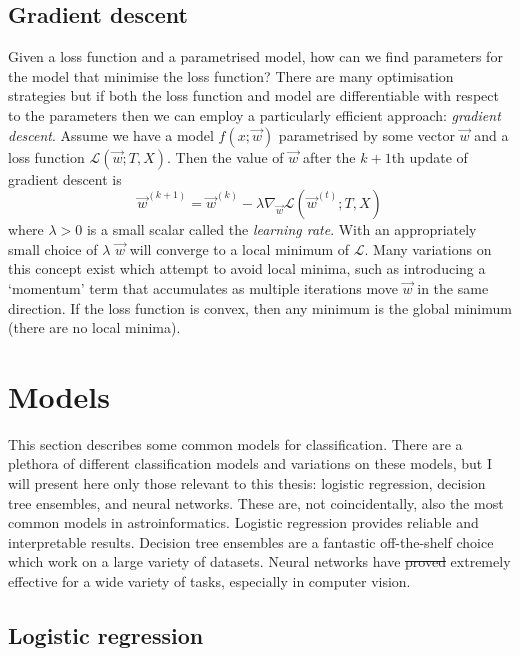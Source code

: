 \documentclass[11pt, a4paper]{book}
\newcommand{\defn}[1]{\emph{#1}}
\providecommand{\DIFaddtex}[1]{{\protect\color{blue}\uwave{#1}}} %
\providecommand{\DIFdeltex}[1]{{\protect\color{red}\sout{#1}}}                      %
\providecommand{\DIFaddbegin}{} %
\providecommand{\DIFaddend}{} %
\providecommand{\DIFdelbegin}{} %
\providecommand{\DIFdelend}{} %
\providecommand{\DIFadd}[1]{\texorpdfstring{\DIFaddtex{#1}}{#1}} %
\providecommand{\DIFdel}[1]{\texorpdfstring{\DIFdeltex{#1}}{}} %
\newcommand{\DIFscaledelfig}{0.5}
\newlength{\DIFdelgraphicswidth} %
\newlength{\DIFdelgraphicsheight} %
\newcommand{\DIFaddincludegraphics}[2][]{{\color{blue}\fbox{\DIFOincludegraphics[#1]{#2}}}} %
\newcommand{\DIFdelincludegraphics}[2][]{%
\sbox{\DIFdelgraphicsbox}{\DIFOincludegraphics[#1]{#2}}%
\settoboxwidth{\DIFdelgraphicswidth}{\DIFdelgraphicsbox} %
\settoboxtotalheight{\DIFdelgraphicsheight}{\DIFdelgraphicsbox} %
\scalebox{\DIFscaledelfig}{%
\parbox[b]{\DIFdelgraphicswidth}{\usebox{\DIFdelgraphicsbox}\\[-\baselineskip] \rule{\DIFdelgraphicswidth}{0em}}\llap{\resizebox{\DIFdelgraphicswidth}{\DIFdelgraphicsheight}{%
\setlength{\unitlength}{\DIFdelgraphicswidth}%
\begin{picture}(1,1)%
\thicklines\linethickness{2pt} %
{\color[rgb]{1,0,0}\put(0,0){\framebox(1,1){}}}%
{\color[rgb]{1,0,0}\put(0,0){\line( 1,1){1}}}%
{\color[rgb]{1,0,0}\put(0,1){\line(1,-1){1}}}%
\end{picture}%
}\hspace*{3pt}}} %
} %
\DeclareRobustCommand{\DIFaddbegin}{\DIFOaddbegin \let\includegraphics\DIFaddincludegraphics} %
\DeclareRobustCommand{\DIFaddend}{\DIFOaddend \let\includegraphics\DIFOincludegraphics} %
\DeclareRobustCommand{\DIFdelbegin}{\DIFOdelbegin \let\includegraphics\DIFdelincludegraphics} %
\DeclareRobustCommand{\DIFdelend}{\DIFOaddend \let\includegraphics\DIFOincludegraphics} %
\begin{document}
    \subsection{Gradient descent}
    \label{sec:gradient-descent}

        Given a loss function and a parametrised model, how can we find parameters for the model that minimise the loss function? There are many optimisation strategies but if both the loss function and model are differentiable with respect to the parameters then we can employ a particularly efficient approach: \defn{gradient descent}. Assume we have a model $f(x; \vec w)$ parametrised by some vector $\vec w$ and a loss function $\mathcal L(\vec w; T, X)$. Then the value of $\vec w$ after the $k + 1$th update of gradient descent is
        \begin{equation}
            \label{eq:gradient-descent}
            \vec w^{(k + 1)} = \vec w^{(k)} - \lambda \nabla_{\vec w} \mathcal L(\vec w^{(t)}; T, X)
        \end{equation}
        where $\lambda > 0$ is a small scalar called the \defn{learning rate}. With an appropriately small choice of $\lambda$ $\vec w$ will converge to a local minimum of $\mathcal L$. Many variations on this concept exist which attempt to avoid local minima, such as introducing a `momentum' term that accumulates as multiple iterations move $\vec w$ in the same direction. If the loss function is convex, then any minimum is the global minimum (there are no local minima).

\section{Models}
\label{sec:models}

    This section describes some common models for classification. There are a plethora of different classification models and variations on these models, but I will present here only those relevant to this thesis: logistic regression, decision tree ensembles, and neural networks. These are, not coincidentally, also the most common models in astroinformatics. Logistic regression provides reliable and interpretable results. Decision tree ensembles are a fantastic off-the-shelf choice which work on a large variety of datasets. Neural networks have \DIFdelbegin \DIFdel{proved }\DIFdelend \DIFaddbegin \DIFadd{proven }\DIFaddend extremely effective for a wide variety of tasks, especially in computer vision.

    \subsection{Logistic regression}
    \label{sec:logistic-regression}
\end{document}
